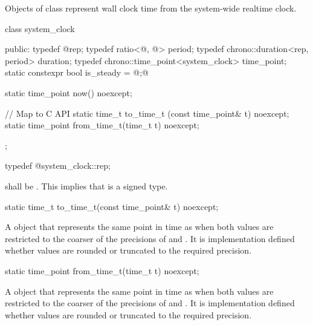 \pnum
Objects of class  represent wall clock time from the system-wide
realtime clock.

\begin{codeblock}
class system_clock {
public:
  typedef @\seebelow@                           rep;
  typedef ratio<@\unspec@, @\unspec@>   period;
  typedef chrono::duration<rep, period>       duration;
  typedef chrono::time_point<system_clock>    time_point;
  static constexpr bool is_steady =        @\unspec;@

  static time_point now() noexcept;

  // Map to C API
  static time_t      to_time_t  (const time_point& t) noexcept;
  static time_point  from_time_t(time_t t) noexcept;
};
\end{codeblock}

%
%
\begin{itemdecl}
typedef @\unspec@ system_clock::rep;
\end{itemdecl}

\begin{itemdescr}
\pnum
\requires {} shall
be . \enternote This implies that  is a signed type. \exitnote
\end{itemdescr}

%
\begin{itemdecl}
static time_t to_time_t(const time_point& t) noexcept;
\end{itemdecl}

\begin{itemdescr}
\pnum
\returns A  object that represents the same point in time as 
when both values are restricted to the coarser of the precisions of  and
.
It is implementation defined whether values are rounded or truncated to the
required precision.
\end{itemdescr}

%
\begin{itemdecl}
static time_point from_time_t(time_t t) noexcept;
\end{itemdecl}

\begin{itemdescr}
\pnum
\returns A  object that represents the same point in time as 
when both values are restricted to the coarser of the precisions of  and
.
It is implementation defined whether values are rounded or truncated to the
required precision.
\end{itemdescr}

